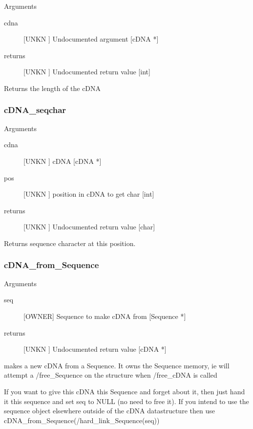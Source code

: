 Arguments
\begin{description}
\item[cdna] [UNKN ] Undocumented argument [cDNA *]
\item[returns] [UNKN ] Undocumented return value [int]
\end{description}
Returns the length of the cDNA


\subsubsection{cDNA_seqchar}

Arguments
\begin{description}
\item[cdna] [UNKN ] cDNA [cDNA *]
\item[pos] [UNKN ] position in cDNA to get char [int]
\item[returns] [UNKN ] Undocumented return value [char]
\end{description}
Returns sequence character at this position.


\subsubsection{cDNA_from_Sequence}

Arguments
\begin{description}
\item[seq] [OWNER] Sequence to make cDNA from [Sequence *]
\item[returns] [UNKN ] Undocumented return value [cDNA *]
\end{description}
makes a new cDNA from a Sequence. It 
owns the Sequence memory, ie will attempt a /free_Sequence
on the structure when /free_cDNA is called


If you want to give this cDNA this Sequence and
forget about it, then just hand it this sequence and set
seq to NULL (no need to free it). If you intend to use 
the sequence object elsewhere outside of the cDNA datastructure
then use cDNA_from_Sequence(/hard_link_Sequence(seq))




